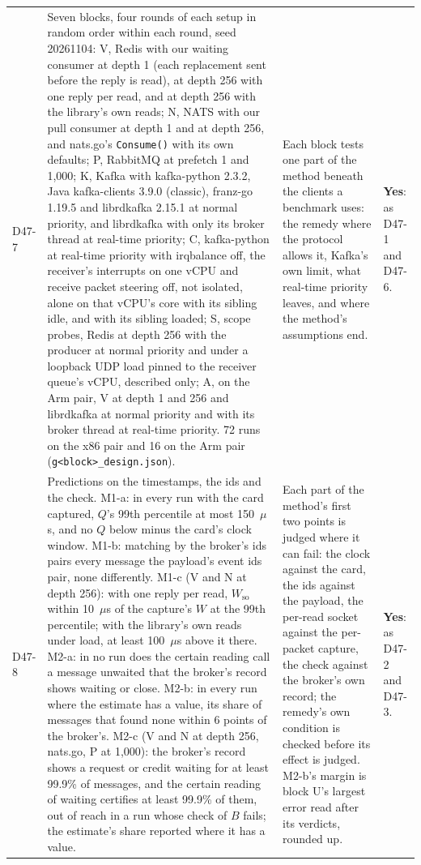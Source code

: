 \documentclass[11pt]{article}
\begin{document}
{\begin{longtable}{@{}p{1.1cm} >{\raggedright\arraybackslash}p{6.1cm} >{\raggedright\arraybackslash}p{6.0cm} >{\raggedright\arraybackslash}p{2.2cm}@{}}
D47-7 & Seven blocks, four rounds of each setup in random order within each round, seed 20261104: V, Redis with our waiting consumer at depth 1 (each replacement sent before the reply is read), at depth 256 with one reply per read, and at depth 256 with the library's own reads; N, NATS with our pull consumer at depth 1 and at depth 256, and nats.go's \texttt{Consume()} with its own defaults; P, RabbitMQ at prefetch 1 and 1,000; K, Kafka with kafka-python 2.3.2, Java kafka-clients 3.9.0 (classic), franz-go 1.19.5 and librdkafka 2.15.1 at normal priority, and librdkafka with only its broker thread at real-time priority; C, kafka-python at real-time priority with irqbalance off, the receiver's interrupts on one vCPU and receive packet steering off, not isolated, alone on that vCPU's core with its sibling idle, and with its sibling loaded; S, scope probes, Redis at depth 256 with the producer at normal priority and under a loopback UDP load pinned to the receiver queue's vCPU, described only; A, on the Arm pair, V at depth 1 and 256 and librdkafka at normal priority and with its broker thread at real-time priority. 72 runs on the x86 pair and 16 on the Arm pair (\texttt{g<block>\_design.json}). & Each block tests one part of the method beneath the clients a benchmark uses: the remedy where the protocol allows it, Kafka's own limit, what real-time priority leaves, and where the method's assumptions end. & \textbf{Yes}: as D47-1 and D47-6. \\
D47-8 & Predictions on the timestamps, the ids and the check. M1-a: in every run with the card captured, $Q$'s 99th percentile at most 150~$\mu$s, and no $Q$ below minus the card's clock window. M1-b: matching by the broker's ids pairs every message the payload's event ids pair, none differently. M1-c (V and N at depth 256): with one reply per read, $W_{\mathrm{so}}$ within 10~$\mu$s of the capture's $W$ at the 99th percentile; with the library's own reads under load, at least 100~$\mu$s above it there. M2-a: in no run does the certain reading call a message unwaited that the broker's record shows waiting or close. M2-b: in every run where the estimate has a value, its share of messages that found none within 6 points of the broker's. M2-c (V and N at depth 256, nats.go, P at 1,000): the broker's record shows a request or credit waiting for at least 99.9\% of messages, and the certain reading of waiting certifies at least 99.9\% of them, out of reach in a run whose check of $B$ fails; the estimate's share reported where it has a value. & Each part of the method's first two points is judged where it can fail: the clock against the card, the ids against the payload, the per-read socket against the per-packet capture, the check against the broker's own record; the remedy's own condition is checked before its effect is judged. M2-b's margin is block U's largest error read after its verdicts, rounded up. & \textbf{Yes}: as D47-2 and D47-3. \\

\end{longtable}}
\end{document}
